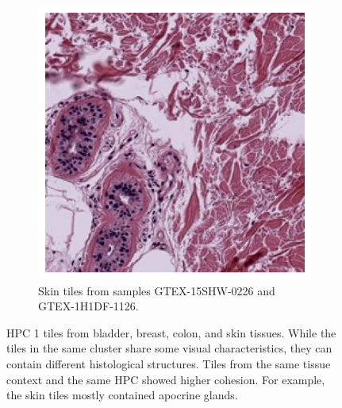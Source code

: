 \documentclass{l4proj}
\begin{document}
\begin{appendices}
\begin{figure}
\begin{subfigure}[b]{\textwidth}
        \includegraphics[width=0.45\linewidth]{images/skin2_1s.png}
        \caption{Skin tiles from samples GTEX-15SHW-0226 and GTEX-1H1DF-1126.}
        \label{fig:leiden1_skin}
    \end{subfigure}
    \caption{HPC 1 tiles from  bladder,  breast,  colon, and  skin tissues. While the tiles in the same cluster share some visual characteristics, they can contain different histological structures. Tiles from the same tissue context and the same HPC showed higher cohesion. For example, the skin tiles mostly contained apocrine glands.}
\end{figure}


\end{appendices}
\end{document}
